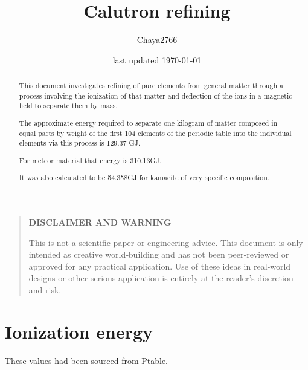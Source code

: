\documentclass[a4paper]{article}
\title{Calutron refining}
\author{Chaya2766}
\date{last updated \today}
\begin{document}
	\sffamily
	\hyphenchar{}
	\sloppy
	
	\maketitle
	
	\textbf{
		\sloppy
		\hyphenchar{}
		}
	
	\vfill
	
	\begin{abstract}
		This document investigates refining of pure elements from general matter through a process involving the ionization of that matter and deflection of the ions in a magnetic field to separate them by mass.
		
		\medskip
		
		The approximate energy required to separate one kilogram of matter composed in equal parts by weight of the first 104 elements of the periodic table into the individual elements via this process is 129.37 GJ.
		
		\medskip
		
		For meteor material that energy is 310.13GJ.
		
		\medskip
		
		It was also calculated to be 54.358GJ for kamacite of very specific composition.
	\end{abstract}
	
	\vfill
	
	\begin{quote}
		\begin{center}
			\textbf{DISCLAIMER AND WARNING}
		\end{center}
		
		This is not a scientific paper or engineering advice.
		This document is only intended as creative world‑building and has not been peer‑reviewed or approved for any practical application.
		Use of these ideas in real‑world designs or other serious application is entirely at the reader’s discretion and risk.
	\end{quote}
	
	\vfill
	
	\tableofcontents
	
	\pagebreak
	
	\section{Ionization energy}
	
	These values had been sourced from \href{https://ptable.com/#Properties/Ionization/1st}{Ptable}.
	
\end{document}
